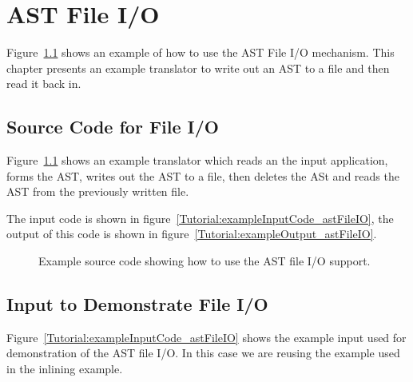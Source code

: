\chapter{AST File I/O}

   Figure~\ref{Tutorial:example_astFileIO} shows an
example of how to use the AST File I/O mechanism.  This chapter 
presents an example translator to write out an AST to a file and 
then read it back in.


\section{Source Code for File I/O}

    Figure~\ref{Tutorial:example_astFileIO}
shows an example translator which reads an the input application, forms the
AST, writes out the AST to a file, then deletes the ASt and reads the
AST from the previously written file. 

The input code is shown in figure~\ref{Tutorial:exampleInputCode_astFileIO},
the output of this code is shown in 
figure~\ref{Tutorial:exampleOutput_astFileIO}.

\begin{figure}[!h]
{\indent
{\mySmallFontSize

\begin{latexonly}
   
\end{latexonly}

\begin{htmlonly}
   
\end{htmlonly}

}
}
\caption{Example source code showing how to use the AST file I/O support.}
\label{Tutorial:example_astFileIO}
\end{figure}



\section{Input to Demonstrate File I/O}

   Figure~\ref{Tutorial:exampleInputCode_astFileIO}
shows the example input used for demonstration of the AST file I/O.
In this case we are reusing the example used in the inlining example.


